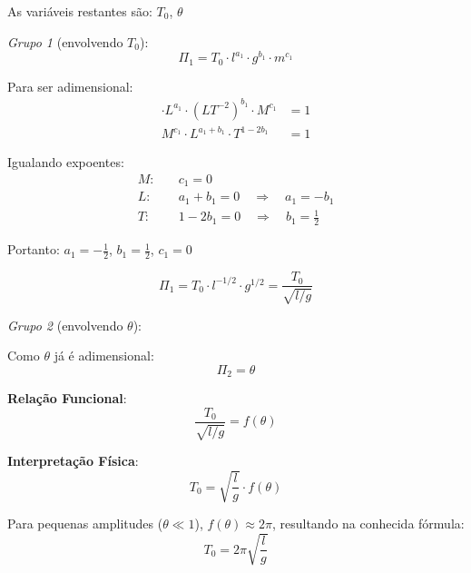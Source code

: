 \documentclass[12pt,a4paper,oneside]{book}
\theoremstyle{definition}
\begin{document}
As variáveis restantes são: $T_0$, $\theta$

\textit{Grupo 1} (envolvendo $T_0$):
\begin{equation}
    \Pi_1 = T_0 \cdot l^{a_1} \cdot g^{b_1} \cdot m^{c_1}
\end{equation}

Para ser adimensional:
\begin{align}
    [T] \cdot L^{a_1} \cdot (LT^{-2})^{b_1} \cdot M^{c_1} &= 1 \\
    M^{c_1} \cdot L^{a_1 + b_1} \cdot T^{1-2b_1} &= 1
\end{align}

Igualando expoentes:
\begin{align}
    M: & \quad c_1 = 0 \\
    L: & \quad a_1 + b_1 = 0 \quad \Rightarrow \quad a_1 = -b_1 \\
    T: & \quad 1 - 2b_1 = 0 \quad \Rightarrow \quad b_1 = \frac{1}{2}
\end{align}

Portanto: $a_1 = -\frac{1}{2}$, $b_1 = \frac{1}{2}$, $c_1 = 0$

\begin{equation}
    \Pi_1 = T_0 \cdot l^{-1/2} \cdot g^{1/2} = \frac{T_0}{\sqrt{l/g}}
\end{equation}

\textit{Grupo 2} (envolvendo $\theta$):

Como $\theta$ já é adimensional:
\begin{equation}
    \Pi_2 = \theta
\end{equation}

\textbf{Relação Funcional}:
\begin{equation}
    \frac{T_0}{\sqrt{l/g}} = f(\theta)
\end{equation}

\textbf{Interpretação Física}:
\begin{equation}
    T_0 = \sqrt{\frac{l}{g}} \cdot f(\theta)
\end{equation}

Para pequenas amplitudes ($\theta \ll 1$), $f(\theta) \approx 2\pi$, resultando na conhecida fórmula:
\begin{equation}
    T_0 = 2\pi\sqrt{\frac{l}{g}}
\end{equation}

\end{document}
